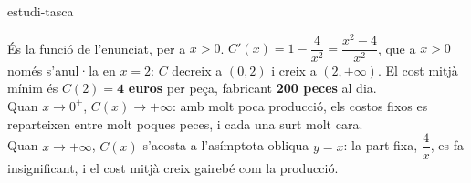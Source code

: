 \begin{apartats}
\begin{tria}{estudi-tasca}
\begin{solucio}
És la funció de l'enunciat, per a $x>0$. $C'(x)=1-\dfrac4{x^2}=\dfrac{x^2-4}{x^2}$, que a $x>0$ només s'anul·la
en $x=2$: $C$ decreix a $(0,2)$ i creix a $(2,+\infty)$. El cost mitjà mínim és $C(2)=\mathbf{4}$ \textbf{euros}
per peça, fabricant \textbf{200 peces} al dia.\\
Quan $x\to0^+$, $C(x)\to+\infty$: amb molt poca producció, els costos fixos es reparteixen entre molt poques
peces, i cada una surt molt cara.\\
Quan $x\to+\infty$, $C(x)$ s'acosta a l'asímptota obliqua $y=x$: la part fixa, $\dfrac4x$, es fa insignificant,
i el cost mitjà creix gairebé com la producció.
\end{solucio}
\end{tria}

\end{apartats}
